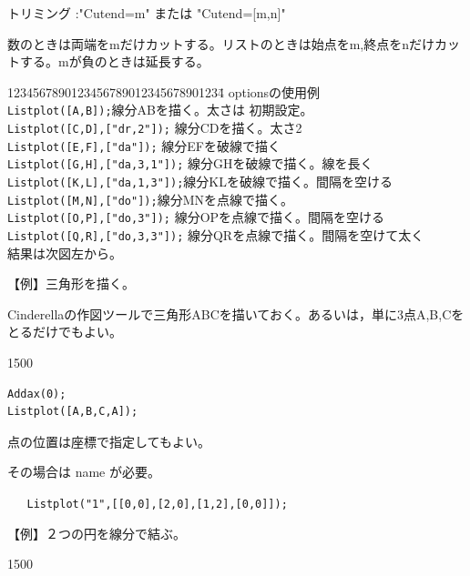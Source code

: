 \documentclass[papersize,a4paper,12pt,uplatex]{jsarticle}
\begin{document}
\begin{description}
トリミング :"Cutend=m" または "Cutend=[m,n]" 

数のときは両端をmだけカットする。リストのときは始点をm,終点をnだけカットする。mが負のときは延長する。

\begin{tabbing}
1234567890123456789012345678901234\=\kill
optionsの使用例\\
\verb|Listplot([A,B]);|\>線分ABを描く。太さは 初期設定。\\
\verb|Listplot([C,D],["dr,2"]);| \>線分CDを描く。太さ2\\
\verb|Listplot([E,F],["da"]);| \>線分EFを破線で描く\\
\verb|Listplot([G,H],["da,3,1"]);| \>線分GHを破線で描く。線を長く\\
\verb|Listplot([K,L],["da,1,3"]);|\>線分KLを破線で描く。間隔を空ける\\
\verb|Listplot([M,N],["do"]);|\>線分MNを点線で描く。\\
\verb|Listplot([O,P],["do,3"]);| \>線分OPを点線で描く。間隔を空ける\\
\verb|Listplot([Q,R],["do,3,3"]);| \>線分QRを点線で描く。間隔を空けて太く\\
結果は次図左から。
\end{tabbing}
\begin{center} \scalebox{0.9}{}\end{center}

【例】三角形を描く。

Cinderellaの作図ツールで三角形ABCを描いておく。あるいは，単に3点A,B,Cをとるだけでもよい。

\begin{layer}{150}{0}
\end{layer}
\hspace{20mm}

\begin{verbatim}
Addax(0);
Listplot([A,B,C,A]);
\end{verbatim}

点の位置は座標で指定してもよい。

その場合は name が必要。

\verb|   Listplot("1",[[0,0],[2,0],[1,2],[0,0]]);|

\vspace{\baselineskip}
【例】２つの円を線分で結ぶ。

\begin{layer}{150}{0}
\end{layer}
\hspace{20mm}


\end{description}
\end{document}
